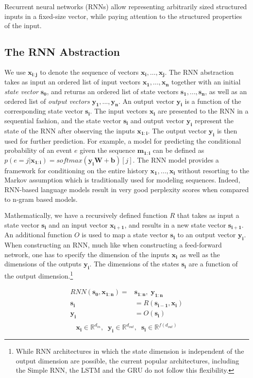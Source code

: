 \documentclass[jair,twoside,11pt,theapa]{article}
\newcommand{\m}[1]{\mathbf{#1}}%
\begin{document}
{Recurrent neural networks (RNNs) \cite{elman1990finding} allow representing
arbitrarily sized structured
inputs in a fixed-size vector, while paying attention to the structured
properties of the input. 

\subsection{The RNN Abstraction}
We use $\m{x_{i:j}}$ to denote the sequence of vectors $\m{x_i},\ldots,\m{x_j}$.
The RNN abstraction takes as input an ordered list of input vectors
$\m{x_1},...,\m{x_n}$ together with an initial \emph{state vector} $\m{s_0}$,
and returns an ordered list of state vectors $\m{s_1},...,\m{s_n}$, as well as
an ordered list of \emph{output vectors} $\m{y_1},...,\m{y_n}$. An output vector
$\m{y_i}$ is a function of the corresponding state vector $\m{s_i}$. 
The input vectors $\m{x_i}$ are presented to the RNN in a sequential fashion, and
the state vector $\m{s_i}$ and output vector $\m{y_i}$ represent the state of the RNN after observing the
inputs $\m{x_{1:i}}$.  The output vector $\m{y_i}$ is then used for further
prediction. For example, a model for predicting the conditional
probability of an event $e$ given the sequence $\m{m_{1:i}}$ can be defined as
$p(e=j|\m{x_{1:i}}) = softmax(\m{y_i}\m{W} + \m{b})[j]$.  The RNN model provides
a framework for conditioning on the entire history $\m{x_1},\ldots,\m{x_i}$
without resorting to the Markov assumption which is traditionally used for modeling
sequences.  Indeed, RNN-based language models result in very good perplexity
scores when compared to n-gram based models.

Mathematically, we have a recursively defined function $R$ that takes as input a
state vector $\m{s_i}$ and an input vector $\m{x_{i+1}}$, and results in a new
state vector $\m{s_{i+1}}$. An additional function $O$ is used to map a state
vector $\m{s_i}$ to an output vector $\m{y_i}$.
When constructing an RNN, much like when constructing a feed-forward network,
one has to specify the dimension of the inputs $\m{x_i}$ as well as the
dimensions of the outputs $\m{y_i}$.  The dimensions of the states $\m{s_i}$ are
a function of the output dimension.\footnote{While RNN architectures in which the state dimension
is independent of the output dimension are possible, the current popular
architectures, including the Simple RNN, the LSTM and the GRU do not follow this
flexibility.}

\begin{align*}
    RNN(\m{s_0},\m{x_{1:n}}) =& \m{s_{1:n}}, \; \m{y_{1:n}} \\
\m{s_i} &= R(\m{s_{i-1}}, \m{x_i}) \\
\m{y_i} &= O(\m{s_i}) \\
\end{align*}
\[
\m{x_i} \in \mathbb{R}^{d_{in}}, \;\;
\m{y_i} \in \mathbb{R}^{d_{out}}, \;\;
\m{s_i} \in \mathbb{R}^{f(d_{out})}
\]

}
\end{document}
